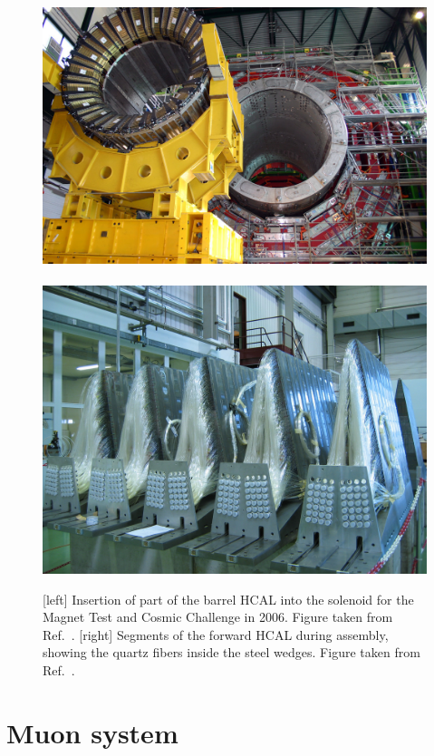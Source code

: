 \begin{figure}[htpb]
  \centering
  \includegraphics[height=0.2\textheight]{figures/cms/cms_hcal}
~
  \includegraphics[height=0.2\textheight]{figures/cms/cms_hf_cds1431489}
  \caption{[left] Insertion of part of the barrel HCAL into the solenoid for the Magnet Test
and Cosmic Challenge in 2006. Figure taken from Ref.~\cite{CMS_hcal}.
[right] Segments of the forward HCAL during assembly, showing the quartz fibers inside the steel
wedges. Figure taken from Ref.~\cite{CMS_hf}. 
  \label{fig:cms_hcal}}
\end{figure}

\section{Muon system \label{sec:cms_muon_system}}

